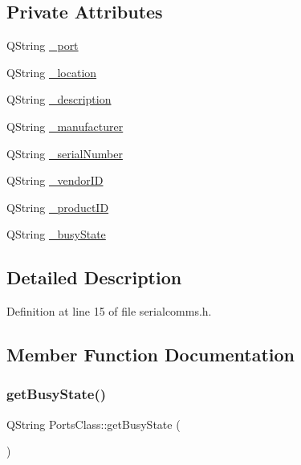 \subsection*{Private Attributes}
\begin{DoxyCompactItemize}
\item 
Q\+String \mbox{\hyperlink{classPortsClass_a7b2aa52c2875846c58e565bed33df8cc}{\+\_\+port}}
\item 
Q\+String \mbox{\hyperlink{classPortsClass_a09cafbfc55f5da779cb33d7ab9a5d963}{\+\_\+location}}
\item 
Q\+String \mbox{\hyperlink{classPortsClass_abb945feb83936d92f49d2d83c9ffe9c7}{\+\_\+description}}
\item 
Q\+String \mbox{\hyperlink{classPortsClass_af8437a5a02dd31176ddc1fab5860c5fe}{\+\_\+manufacturer}}
\item 
Q\+String \mbox{\hyperlink{classPortsClass_a6da92952a206b58a2325cd8d3393c438}{\+\_\+serial\+Number}}
\item 
Q\+String \mbox{\hyperlink{classPortsClass_ac7fb67486a136f2a0667d2b4b1be403e}{\+\_\+vendor\+ID}}
\item 
Q\+String \mbox{\hyperlink{classPortsClass_abee7fa7a0c5b404bb642709d47720b4f}{\+\_\+product\+ID}}
\item 
Q\+String \mbox{\hyperlink{classPortsClass_a2b0fb1fe4e32ba5f05a3fe29433b2734}{\+\_\+busy\+State}}
\end{DoxyCompactItemize}


\subsection{Detailed Description}


Definition at line 15 of file serialcomms.\+h.



\subsection{Member Function Documentation}
\mbox{\label{classPortsClass_a2cfe00d894c50c8b175571455e293497}} 
\subsubsection{\texorpdfstring{getBusyState()}{getBusyState()}}
{\footnotesize\ttfamily Q\+String Ports\+Class\+::get\+Busy\+State (\begin{DoxyParamCaption}{ }\end{DoxyParamCaption})}



